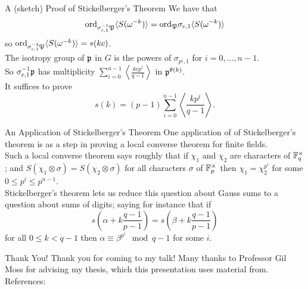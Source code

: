 \documentclass[presentation]{beamer}
\begin{document}
\begin{frame}{A (sketch) Proof of Stickelberger's Theorem}
We have that \[\textrm{ord}_{\sigma_{c,1}^{-1} \mathfrak{P}} \langle S(\omega^{-k})\rangle = \textrm{ord}_{ \mathfrak{P}} \sigma_{c,1}\langle S(\omega^{-k})\rangle \] so $\textrm{ord}_{\sigma_{c,1}^{-1} \mathfrak{P}} \langle S(\omega^{-k})\rangle = s(kc)$.\\

\pause The isotropy group of $\mathfrak{p}$ in $G$ is the powers of $\sigma_{p^i,1}$ for $i = 0, \ldots, n-1$. 
\\
\pause
\vspace{0.5cm}
So $\sigma_{c,1}^{-1} \mathfrak{p}$ has multiplicity $\sum_{i=0}^{n-1} \left\langle \frac{kcp^i}{q-1} \right\rangle$ in $\mathfrak{p}^{\theta(k)}$.
\\
\pause
\vspace{0.5cm}
It suffices to prove \[s(k) = (p-1)\sum_{i=0}^{n-1} \left \langle \frac{k p^i}{q-1} \right \rangle.\]
\end{frame}

\begin{frame}{An Application of Stickelberger's Theorem}
One application of of Stickelberger's theorem is as a step in proving a local converse theorem for finite fields.\\
\pause
\vspace{0.5cm}
Such a local converse theorem says roughly that if $\chi_1$ and $\chi_2$ are characters of $\mathbb{F}_q^\times$; and $S(\chi_1 \otimes \sigma) = S(\chi_2 \otimes \sigma)$ for all characters $\sigma$ of $\mathbb{F}_p^\times$ then $\chi_1 = \chi_2^{p^i}$ for some $0 \leq p^i \leq p^{n-1}$.
\\
\pause
\vspace{0.5cm}
Stickelberger's theorem lets us reduce this question about Gauss sums to a question about sums of digits; saying for instance that if \[s\left(\alpha + k\frac{q-1}{p-1}\right) = s\left(\beta + k \frac{q-1}{p-1}\right)\] for all $0 \leq k < q-1$ then $\alpha \equiv \beta^{p^i} \mod q-1$ for some $i$.
\end{frame}



\begin{frame}{Thank You!}
Thank you for coming to my talk! Many thanks to Professor Gil Moss for advising my thesis, which this presentation uses material from.\\
\medskip
References:
\medskip
    

\end{frame}
\end{document}
